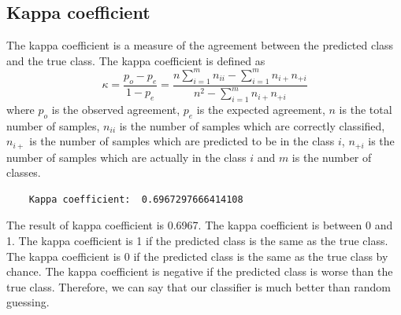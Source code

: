 \documentclass[12pt
,headinclude
,headsepline
,bibtotocnumbered
]{scrartcl}
\begin{document}
\subsection*{Kappa coefficient}
The kappa coefficient is a measure of the agreement between the predicted class and the true class. The kappa coefficient is defined as
\begin{equation*}
    \kappa=\frac{p_o-p_e}{1-p_e}=\frac{n\sum_{i=1}^{m}n_{ii}-\sum_{i=1}^{m}n_{i+}n_{+i}}{n^2-\sum_{i=1}^{m}n_{i+}n_{+i}}
\end{equation*}
where $p_o$ is the observed agreement, $p_e$ is the expected agreement, $n$ is the total number of samples, $n_{ii}$ is the number of samples which are correctly classified, $n_{i+}$ is the number of samples which are predicted to be in the class $i$, $n_{+i}$ is the number of samples which are actually in the class $i$ and $m$ is the number of classes.
\begin{verbatim}
    Kappa coefficient:  0.6967297666414108
\end{verbatim}
The result of kappa coefficient is 0.6967. The kappa coefficient is between 0 and 1. The kappa coefficient is 1 if the predicted class is the same as the true class. The kappa coefficient is 0 if the predicted class is the same as the true class by chance. The kappa coefficient is negative if the predicted class is worse than the true class. Therefore, we can say that our classifier is much better than random guessing.
\end{document}

